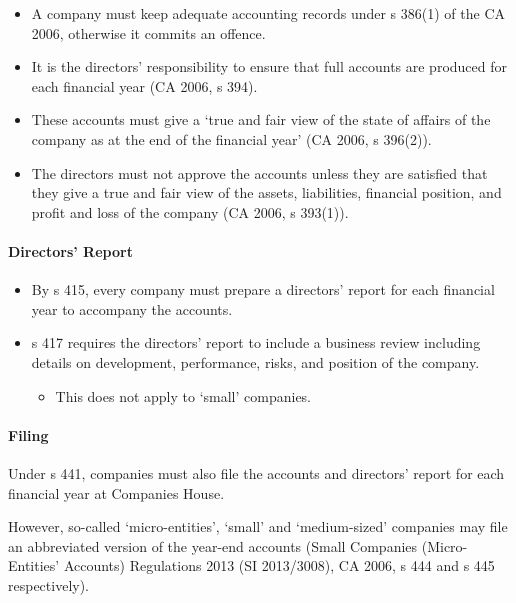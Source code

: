 \documentclass[
]{article}
\providecommand{\tightlist}{%
  \setlength{\itemsep}{0pt}\setlength{\parskip}{0pt}}
\begin{document}
\begin{itemize}
\tightlist
\item
  A company must keep adequate accounting records under s 386(1) of the
  CA 2006, otherwise it commits an offence.
\item
  It is the directors' responsibility to ensure that full accounts are
  produced for each financial year (CA 2006, s 394).
\item
  These accounts must give a `true and fair view of the state of affairs
  of the company as at the end of the financial year' (CA 2006, s
  396(2)).
\item
  The directors must not approve the accounts unless they are satisfied
  that they give a true and fair view of the assets, liabilities,
  financial position, and profit and loss of the company (CA 2006, s
  393(1)).
\end{itemize}

\hypertarget{directors-report}{%
\paragraph{Directors' Report}\label{directors-report}}

\begin{itemize}
\tightlist
\item
  By s 415, every company must prepare a directors' report for each
  financial year to accompany the accounts.
\item
  s 417 requires the directors' report to include a business review
  including details on development, performance, risks, and position of
  the company.

  \begin{itemize}
  \tightlist
  \item
    This does not apply to `small' companies.
  \end{itemize}
\end{itemize}

\hypertarget{filing}{%
\paragraph{Filing}\label{filing}}

Under s 441, companies must also file the accounts and directors' report
for each financial year at Companies House.

However, so-called `micro-entities', `small' and `medium-sized'
companies may file an abbreviated version of the year-end accounts
(Small Companies (Micro-Entities' Accounts) Regulations 2013 (SI
2013/3008), CA 2006, s 444 and s 445 respectively).
\end{document}
